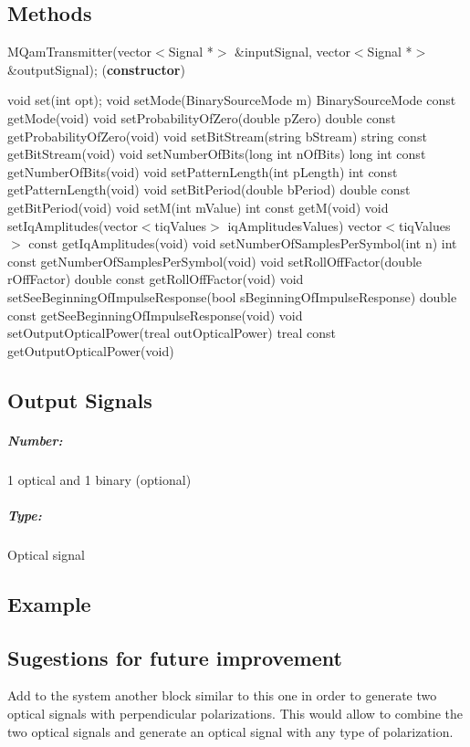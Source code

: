\documentclass[a4paper]{article}
\begin{document}
\pagebreak

\subsection*{Methods}

MQamTransmitter(vector$<$Signal *$>$ \&inputSignal, vector$<$Signal *$>$ \&outputSignal); (\textbf{constructor})
\bigbreak

void set(int opt);
\bigbreak
void setMode(BinarySourceMode m)
\bigbreak
BinarySourceMode const getMode(void)
\bigbreak
void setProbabilityOfZero(double pZero)
\bigbreak
double const getProbabilityOfZero(void)
\bigbreak
void setBitStream(string bStream) 
\bigbreak
string const getBitStream(void)
\bigbreak
void setNumberOfBits(long int nOfBits)
\bigbreak
long int const getNumberOfBits(void)
\bigbreak
void setPatternLength(int pLength) 
\bigbreak
int const getPatternLength(void) 
\bigbreak
void setBitPeriod(double bPeriod) 
\bigbreak
double const getBitPeriod(void) 
\bigbreak
void setM(int mValue)
int const getM(void) 
\bigbreak
void setIqAmplitudes(vector$<$t\textunderscore iqValues$>$ iqAmplitudesValues) 
\bigbreak
vector$<$t\textunderscore iqValues$>$ const getIqAmplitudes(void)
\bigbreak
void setNumberOfSamplesPerSymbol(int n)
\bigbreak
int const getNumberOfSamplesPerSymbol(void)
\bigbreak
void setRollOffFactor(double rOffFactor)
\bigbreak
double const getRollOffFactor(void)
\bigbreak
void setSeeBeginningOfImpulseResponse(bool sBeginningOfImpulseResponse)
\bigbreak
double const getSeeBeginningOfImpulseResponse(void)
\bigbreak
void setOutputOpticalPower(t\textunderscore real outOpticalPower)
\bigbreak
t\textunderscore real const getOutputOpticalPower(void)
\bigbreak
\bigbreak
 
\pagebreak

\subsection*{Output Signals}

\subparagraph*{Number:} 1 optical and 1 binary (optional)

\subparagraph*{Type:} Optical signal

\subsection*{Example} 

\subsection*{Sugestions for future improvement}

Add to the system another block similar to this one in order to generate two optical signals with perpendicular polarizations. This would allow to combine the two optical signals and generate an optical signal with any type of polarization.
\end{document}
